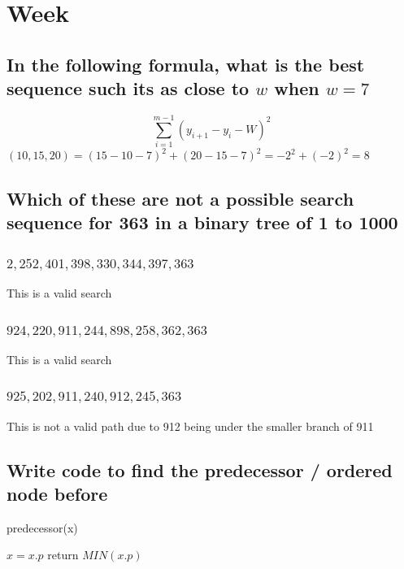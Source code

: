 \documentclass[12pt, a4paper]{article}
\begin{document}
		\section{Week}
			\subsection{In the following formula, what is the best sequence such its as close to $w$ when $w=7$}
				$$\sum\limits_{i=1}^{m-1}(y_{i+1}-y_i-W)^2$$
				$(10,15,20)=(15-10-7)^2+(20-15-7)^2=-2^2+(-2)^2=8$
			\subsection{Which of these are not a possible search sequence for 363 in a binary tree of 1 to 1000}
				\subsubsection{$2,252,401,398,330,344,397,363$}
					This is a valid search
				\subsubsection{$924,220,911,244,898,258,362,363$}
					This is a valid search
				\subsubsection{$925,202,911,240,912,245,363$}
					This is not a valid path due to 912 being under the smaller branch of 911
			\subsection{Write code to find the predecessor / ordered node before}
				predecessor(x)
				\begin{algorithmic}[1]
						\State $x = x.p$
					\EndWhile
					\State return $MIN(x.p)$
				\end{algorithmic}
\end{document}
